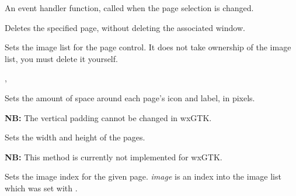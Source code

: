 

\label{wxnotebookonselchange}


An event handler function, called when the page selection is changed.




\label{wxnotebookremovepage}


Deletes the specified page, without deleting the associated window.


\label{wxnotebooksetimagelist}


Sets the image list for the page control. It does not take
ownership of the image list, you must delete it yourself.


,


\label{wxnotebooksetpadding}


Sets the amount of space around each page's icon and label, in pixels.

{\bf NB:} The vertical padding cannot be changed in wxGTK.


\label{wxnotebooksetpagesize}


Sets the width and height of the pages.

{\bf NB:} This method is currently not implemented for wxGTK.


\label{wxnotebooksetpageimage}


Sets the image index for the given page. {\it image} is an index into
the image list which was set with .


